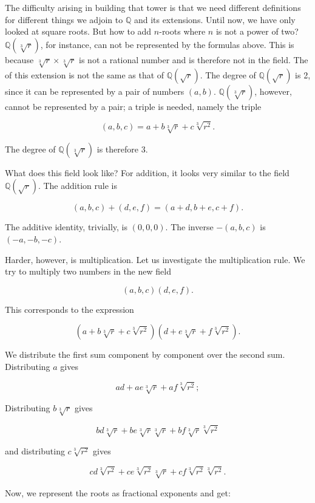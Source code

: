 \documentclass[tikz]{scrreprt}
\begin{document}
The difficulty arising in building that tower
is that we need different definitions for different
things we adjoin to $\mathbb{Q}$ and its extensions.
Until now, we have only looked at square roots.
But how to add $n$-roots where $n$ is not a power of two?
$\mathbb{Q}(\sqrt[3]{r})$, for instance, can not be represented
by the formulas above.
This is because $\sqrt[3]{r} \times \sqrt[3]{r}$
is not a rational number and is therefore not in the field.
The  of this extension is not the same as that of
$\mathbb{Q}(\sqrt{r})$.
The degree of 
$\mathbb{Q}(\sqrt{r})$ is 2, since it can be represented by a pair of numbers
$(a,b)$.
$\mathbb{Q}(\sqrt[3]{r})$, however, cannot be represented by a pair;
a triple is needed, namely the triple

\[
(a,b,c) = a + b\sqrt[3]{r} + c\sqrt[3]{r^2}.
\]

The degree of $\mathbb{Q}(\sqrt[3]{r})$ is therefore 3.

What does this field look like?
For addition, it looks very similar to the field $\mathbb{Q}(\sqrt{r})$.
The addition rule is

\begin{equation}\label{fieldExtAdd3}
(a,b,c) + (d,e,f) = (a+d,b+e,c+f).
\end{equation}

The additive identity, trivially, is $(0,0,0)$.
The inverse $-(a,b,c)$ is $(-a,-b,-c)$.

Harder, however, is multiplication.
Let us investigate the multiplication rule.
We try to multiply two numbers in the new field

\[
(a,b,c)(d,e,f).
\]

This corresponds to the expression

\[
(a+b\sqrt[3]{r}+c\sqrt[3]{r^2})
(d+e\sqrt[3]{r}+f\sqrt[3]{r^2}).
\]

We distribute the first sum 
component by component
over the second sum.
Distributing $a$ gives

\[
ad+ae\sqrt[3]{r}+af\sqrt[3]{r^2};
\]

Distributing $b\sqrt[3]{r}$ gives

\[
bd\sqrt[3]{r}+be\sqrt[3]{r}\sqrt[3]{r}+bf\sqrt[3]{r}\sqrt[3]{r^2}
\]

and distributing $c\sqrt[3]{r^2}$ gives

\[
cd\sqrt[3]{r^2}+ce\sqrt[3]{r^2}\sqrt[3]{r}+cf\sqrt[3]{r^2}\sqrt[3]{r^2}.
\]

Now, we represent the roots as fractional exponents and get:
\end{document}
